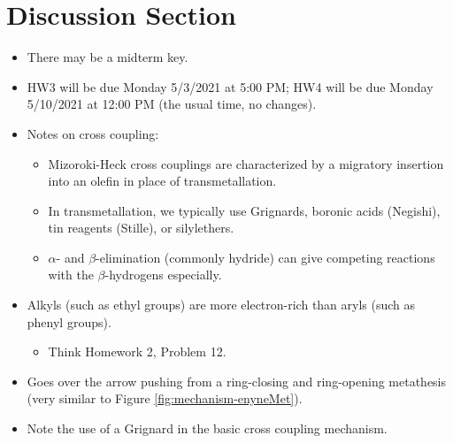 \documentclass[../notes.tex]{subfiles}
\begin{document}
\section{Discussion Section}
\begin{itemize}
    \item {}There may be a midterm key.
    \item HW3 will be due Monday 5/3/2021 at 5:00 PM; HW4 will be due Monday 5/10/2021 at 12:00 PM (the usual time, no changes).
    \item Notes on cross coupling:
    \begin{itemize}
        \item Mizoroki-Heck cross couplings are characterized by a migratory insertion into an olefin in place of transmetallation.
        \item In transmetallation, we typically use Grignards, boronic acids (Negishi), tin reagents (Stille), or silylethers.
        \item $\alpha$- and $\beta$-elimination (commonly hydride) can give competing reactions with the $\beta$-hydrogens especially.
    \end{itemize}
    \item Alkyls (such as ethyl groups) are more electron-rich than aryls (such as phenyl groups).
    \begin{itemize}
        \item Think Homework 2, Problem 12.
    \end{itemize}
    \item Goes over the arrow pushing from a ring-closing and ring-opening metathesis (very similar to Figure \ref{fig:mechanism-enyneMet}).
    \item Note the use of a Grignard in the basic cross coupling mechanism.
\end{itemize}
\end{document}
